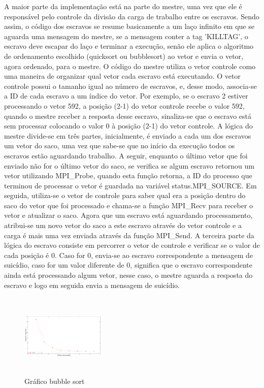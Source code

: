 \documentclass{article}
\begin{document}
\begin{multicols*}{2}
A maior parte da implementação está na parte do mestre, uma vez que ele é responsável pelo controle da divisão da carga de trabalho entre os escravos. Sendo assim, o código dos escravos se resume basicamente a um laço infinito em que se aguarda uma mensagem do mestre, se a mensagem conter a tag 'KILLTAG', o escravo deve escapar do laço e terminar a execução, senão ele aplica o algoritmo de ordenamento escolhido (quicksort ou bubblesort) ao vetor e envia o vetor, agora ordenado, para o mestre. O código do mestre utiliza o vetor controle como uma maneira de organizar qual vetor cada escravo está executando. O vetor controle possui o tamanho igual ao número de escravos, e, desse modo, associa-se a ID de cada escravo a um índice do vetor. Por exemplo, se o escravo 2 estiver processando o vetor 592, a posição (2-1) do vetor controle recebe o valor 592, quando o mestre receber a resposta desse escravo, sinaliza-se que o escravo está sem processar colocando o valor 0 à posição (2-1) do vetor controle. A lógica do mestre divide-se em três partes, inicialmente, é enviado a cada um dos escravos um vetor do saco, uma vez que sabe-se que no início da execução todos os escravos estão aguardando trabalho. A seguir, enquanto o último vetor que foi enviado não for o último vetor do saco, se verifica se algum escravo retornou um vetor utilizando MPI\_Probe, quando esta função retorna, a ID do processo que terminou de processar o vetor é guardada na variável status.MPI\_SOURCE. Em seguida, utiliza-se o vetor de controle para saber qual era a posição dentro do saco do vetor que foi processado e chama-se a função MPI\_Recv para receber o vetor e atualizar o saco. Agora que um escravo está aguardando processamento, atribui-se um novo vetor do saco a este escravo através do vetor controle e a carga é mais uma vez enviada através da função MPI\_Send. A terceira parte da lógica do escravo consiste em percorrer o vetor de controle e verificar se o valor de cada posição é 0. Caso for 0, envia-se ao escravo correspondente a mensagem de suicídio, caso for um valor diferente de 0, significa que o escravo correspondente ainda está processando algum vetor, nesse caso, o mestre aguarda a resposta do escravo e logo em seguida envia a mensagem de suicídio.

\begin{figure}[H]
            \centering
            \vspace{-0.3em}
            \includegraphics[width=4cm, height=4cm]{bsort.PNG}
            \vspace{-0.6em}
            \caption{Gráfico bubble sort}
            \vspace{-1.1em}
\end{figure}


\end{multicols*}
\end{document}

